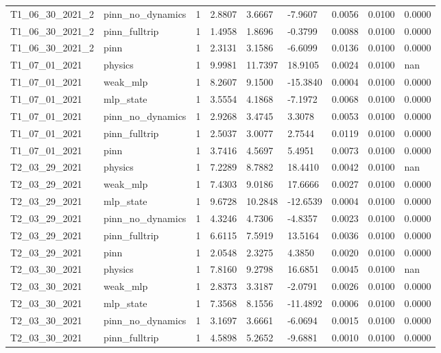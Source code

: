 \begin{table}[t]
\begin{tabular}{lllllllll}
T1\_06\_30\_2021\_2 & pinn\_no\_dynamics & 1 & 2.8807 & 3.6667 & -7.9607 & 0.0056 & 0.0100 & 0.0000 \\
T1\_06\_30\_2021\_2 & pinn\_fulltrip & 1 & 1.4958 & 1.8696 & -0.3799 & 0.0088 & 0.0100 & 0.0000 \\
T1\_06\_30\_2021\_2 & pinn & 1 & 2.3131 & 3.1586 & -6.6099 & 0.0136 & 0.0100 & 0.0000 \\
T1\_07\_01\_2021 & physics & 1 & 9.9981 & 11.7397 & 18.9105 & 0.0024 & 0.0100 & nan \\
T1\_07\_01\_2021 & weak\_mlp & 1 & 8.2607 & 9.1500 & -15.3840 & 0.0004 & 0.0100 & 0.0000 \\
T1\_07\_01\_2021 & mlp\_state & 1 & 3.5554 & 4.1868 & -7.1972 & 0.0068 & 0.0100 & 0.0000 \\
T1\_07\_01\_2021 & pinn\_no\_dynamics & 1 & 2.9268 & 3.4745 & 3.3078 & 0.0053 & 0.0100 & 0.0000 \\
T1\_07\_01\_2021 & pinn\_fulltrip & 1 & 2.5037 & 3.0077 & 2.7544 & 0.0119 & 0.0100 & 0.0000 \\
T1\_07\_01\_2021 & pinn & 1 & 3.7416 & 4.5697 & 5.4951 & 0.0073 & 0.0100 & 0.0000 \\
T2\_03\_29\_2021 & physics & 1 & 7.2289 & 8.7882 & 18.4410 & 0.0042 & 0.0100 & nan \\
T2\_03\_29\_2021 & weak\_mlp & 1 & 7.4303 & 9.0186 & 17.6666 & 0.0027 & 0.0100 & 0.0000 \\
T2\_03\_29\_2021 & mlp\_state & 1 & 9.6728 & 10.2848 & -12.6539 & 0.0004 & 0.0100 & 0.0000 \\
T2\_03\_29\_2021 & pinn\_no\_dynamics & 1 & 4.3246 & 4.7306 & -4.8357 & 0.0023 & 0.0100 & 0.0000 \\
T2\_03\_29\_2021 & pinn\_fulltrip & 1 & 6.6115 & 7.5919 & 13.5164 & 0.0036 & 0.0100 & 0.0000 \\
T2\_03\_29\_2021 & pinn & 1 & 2.0548 & 2.3275 & 4.3850 & 0.0020 & 0.0100 & 0.0000 \\
T2\_03\_30\_2021 & physics & 1 & 7.8160 & 9.2798 & 16.6851 & 0.0045 & 0.0100 & nan \\
T2\_03\_30\_2021 & weak\_mlp & 1 & 2.8373 & 3.3187 & -2.0791 & 0.0026 & 0.0100 & 0.0000 \\
T2\_03\_30\_2021 & mlp\_state & 1 & 7.3568 & 8.1556 & -11.4892 & 0.0006 & 0.0100 & 0.0000 \\
T2\_03\_30\_2021 & pinn\_no\_dynamics & 1 & 3.1697 & 3.6661 & -6.0694 & 0.0015 & 0.0100 & 0.0000 \\
T2\_03\_30\_2021 & pinn\_fulltrip & 1 & 4.5898 & 5.2652 & -9.6881 & 0.0010 & 0.0100 & 0.0000 \\

\end{tabular}
\end{table}
